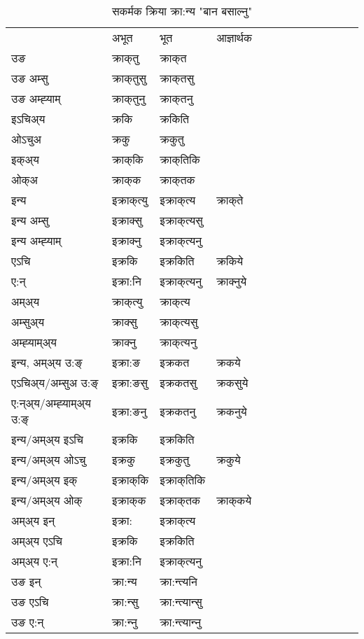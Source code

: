 \begin{table}[H]
\centering
\caption{\label{akt.vt} सकर्मक क्रिया  क्रा:न्य  "बान बसाल्नु"  }
\begin{tabular}{l|l|l|l|l|l|l|l|l|l|l|l|l}  \toprule
&अभूत & भूत & आज्ञार्थक \\ 
उङ &क्राक्‌तु &क्राक्‌त \\ 
उङ अम्सु&क्राक्‌तुसु &क्राक्‌तसु \\ 
उङ अम्ह्‍याम्&क्राक्‌तुनु &क्राक्‌तनु \\ 
इऽचिअ्य &क्रकि &क्रकिति   \\ 
ओऽचुअ        &क्रकु &क्रकुतु   \\ 
इक्अ्य&क्राक्‌कि &क्राक्‌तिकि   \\ 
ओक्अ &क्राक्‌क &क्राक्‌तक   \\ 
इन्य & इक्राक्‌त्यु  & इक्राक्‌त्य &क्राक्‌ते  \\ 
इन्य अम्सु& इक्राक्सु  & इक्राक्‌त्यसु   \\ 
इन्य अम्ह्‍याम्& इक्राक्‍नु  & इक्राक्‌त्यनु   \\ 
एऽचि & इक्रकि & इक्रकिति &क्रकिये    \\ 
ए:न् & इक्रा:नि  & इक्राक्‌त्यनु &क्राक्‍नुये  \\ 
अम्अ्य & क्राक्‌त्यु  & क्राक्‌त्य  \\ 
अम्सुअ्य & क्राक्सु & क्राक्‌त्यसु  \\ 
अम्ह्‍याम्अ्य & क्राक्‍नु  & क्राक्‌त्यनु \\ 
\midrule
इन्य, अम्अ्य उ:ङ्‌ &इक्रा:ङ &इक्रकत &क्रकये \\ 
एऽचिअ्य/अम्सुअ उ:ङ्‌ &इक्रा:ङसु &इक्रकतसु &क्रकसुये \\ 
ए:न्अ्य/अम्ह्‍याम्अ्य उ:ङ्‌ &इक्रा:ङनु &इक्रकतनु &क्रकनुये \\ 
इन्य/अम्अ्य इऽचि &इक्रकि &इक्रकिति    \\ 
इन्य/अम्अ्य ओऽचु &इक्रकु &इक्रकुतु  &क्रकुये  \\ 
इन्य/अम्अ्य इक् &इक्राक्‌कि &इक्राक्‌तिकि   \\ 
इन्य/अम्अ्य ओक् &इक्राक्‌क &इक्राक्‌तक  &क्राक्‌कये  \\ 
अम्अ्य इन् & इक्रा: & इक्राक्‌त्य   \\ 
अम्अ्य एऽचि & इक्रकि & इक्रकिति    \\ 
अम्अ्य ए:न् & इक्रा:नि  & इक्राक्‌त्यनु  \\ 
\midrule
उङ इन् & क्रा:न्य  & क्रा:न्त्यनि  \\ 
उङ एऽचि & क्रा:न्सु  & क्रा:न्त्यान्सु   \\ 
उङ ए:न्& क्रा:न्‍नु  & क्रा:न्त्यान्‍नु   \\ 
\bottomrule
\end{tabular}
\end{table}


